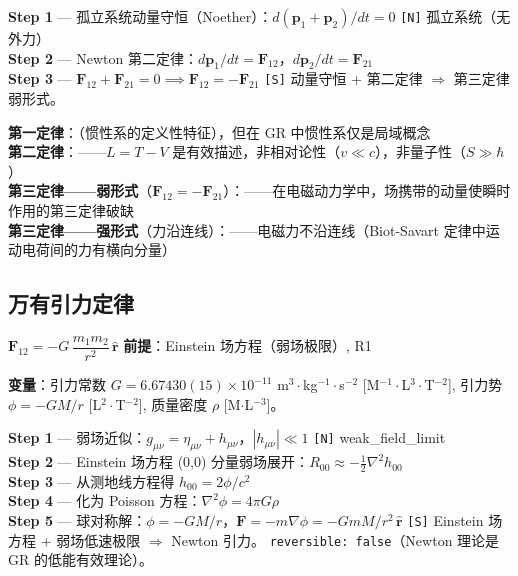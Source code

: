 \begin{derivationbox}[推导]
  \textbf{Step 1} — 孤立系统动量守恒（Noether）：$d(\mathbf{p}_1 + \mathbf{p}_2)/dt = 0$
  \texttt{[N]} 孤立系统（无外力）\\
  \textbf{Step 2} — Newton 第二定律：$d\mathbf{p}_1/dt = \mathbf{F}_{12}$，$d\mathbf{p}_2/dt = \mathbf{F}_{21}$\\
  \textbf{Step 3} — $\mathbf{F}_{12} + \mathbf{F}_{21} = 0 \implies \mathbf{F}_{12} = -\mathbf{F}_{21}$
  \quad\texttt{[S]} 动量守恒 + 第二定律 $\Rightarrow$ 第三定律弱形式。
\end{derivationbox}


  \textbf{第一定律}：\precexact（惯性系的定义性特征），但在 GR 中惯性系仅是局域概念\\
  \textbf{第二定律}：\preceffective——$L = T-V$ 是有效描述，非相对论性（$v \ll c$），非量子性（$S \gg \hbar$）\\
  \textbf{第三定律——弱形式}（$\mathbf{F}_{12} = -\mathbf{F}_{21}$）：\preceffective——在电磁动力学中，场携带的动量使瞬时作用的第三定律破缺\\
  \textbf{第三定律——强形式}（力沿连线）：\precisionapprox——电磁力不沿连线（Biot-Savart 定律中运动电荷间的力有横向分量）
\endprecisionbox

\subsection{万有引力定律}

\begin{lawbox}
  $\mathbf{F}_{12} = -G\,\dfrac{m_1 m_2}{r^2}\,\hat{\mathbf{r}}$
  \quad\textbf{前提}：Einstein 场方程（弱场极限）, R1
\end{lawbox}

\noindent\textbf{变量}：引力常数 $G = 6.67430(15)\times10^{-11}$ m$^3\cdot$kg$^{-1}\cdot$s$^{-2}$ [M$^{-1}\cdot$L$^3\cdot$T$^{-2}$],
引力势 $\phi = -GM/r$ [L$^2\cdot$T$^{-2}$], 质量密度 $\rho$ [M$\cdot$L$^{-3}$]。

\begin{derivationbox}
  \textbf{Step 1} — 弱场近似：$g_{\mu\nu} = \eta_{\mu\nu} + h_{\mu\nu}$，$|h_{\mu\nu}| \ll 1$
  \texttt{[N]} weak\_field\_limit\\
  \textbf{Step 2} — Einstein 场方程 (0,0) 分量弱场展开：$R_{00} \approx -\frac{1}{2}\nabla^2 h_{00}$\\
  \textbf{Step 3} — 从测地线方程得 $h_{00} = 2\phi/c^2$\\
  \textbf{Step 4} — 化为 Poisson 方程：$\nabla^2\phi = 4\pi G\rho$\\
  \textbf{Step 5} — 球对称解：$\phi = -GM/r$，$\mathbf{F} = -m\nabla\phi = -GmM/r^2\,\hat{\mathbf{r}}$
  \quad\texttt{[S]} Einstein 场方程 + 弱场低速极限 $\Rightarrow$ Newton 引力。
  \texttt{reversible: false}（Newton 理论是 GR 的低能有效理论）。
\end{derivationbox}

